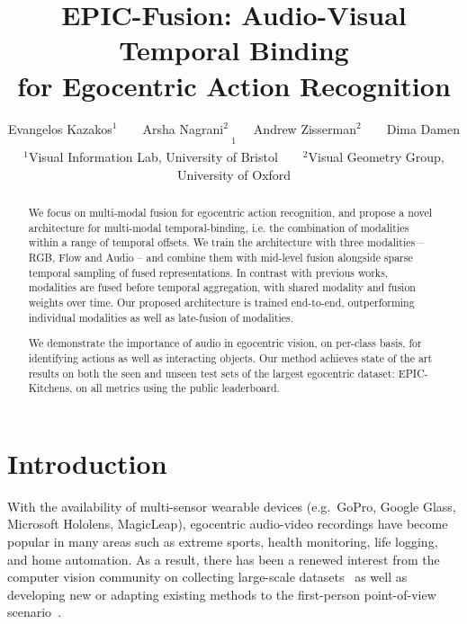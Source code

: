\documentclass[10pt,twocolumn,letterpaper]{article}
\begin{document}
\title{EPIC-Fusion: Audio-Visual Temporal Binding\\ for Egocentric Action Recognition}

\author{Evangelos Kazakos$^1$~~~~Arsha Nagrani$^2$~~~~Andrew Zisserman$^2$~~~~Dima Damen$^1$\\
$^1$Visual Information Lab, University of Bristol~~~~$^2$Visual Geometry Group, University of Oxford\\
}

\maketitle

\ificcvfinal\thispagestyle{empty}\fi
\begin{abstract}

We focus on multi-modal fusion for egocentric action recognition, 
and propose a novel architecture for multi-modal temporal-binding, i.e. the combination of modalities within a range of temporal offsets. We train the architecture with three modalities -- RGB, Flow and Audio -- and combine them with
mid-level fusion alongside sparse temporal sampling of fused representations. 
In contrast with previous works, modalities are fused before temporal aggregation, with shared modality and fusion weights over time.
Our proposed architecture is trained end-to-end, outperforming individual modalities as well as late-fusion of modalities.

We demonstrate the importance of audio in egocentric vision, on per-class basis, for identifying actions as well as interacting objects.
Our method achieves state of the art results on both the seen and unseen test sets of the largest egocentric dataset: EPIC-Kitchens, on all metrics using the public leaderboard.

\end{abstract}

\section{Introduction}
With the availability of multi-sensor wearable devices (e.g.\ GoPro, Google Glass, Microsoft Hololens, MagicLeap), egocentric audio-video recordings have become popular in many areas such as extreme sports, health monitoring, life logging, and home automation.
As a result, there has been a renewed interest from the computer vision community on collecting large-scale datasets~\cite{Damen_2018_ECCV,sigurdsson2018charadesego} as well as developing new or adapting
existing methods to the first-person point-of-view scenario~\cite{zhou2015temporal,Pirsiavash2012,Lee2012,Ma_2016_CVPR,Damen2014a,Yonetani2016}.
\end{document}
